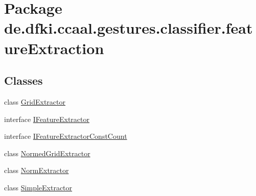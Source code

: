 \hypertarget{namespacede_1_1dfki_1_1ccaal_1_1gestures_1_1classifier_1_1feature_extraction}{\section{Package de.\-dfki.\-ccaal.\-gestures.\-classifier.\-feature\-Extraction}
\label{namespacede_1_1dfki_1_1ccaal_1_1gestures_1_1classifier_1_1feature_extraction}
}
\subsection*{Classes}
\begin{DoxyCompactItemize}
\item 
class \hyperlink{classde_1_1dfki_1_1ccaal_1_1gestures_1_1classifier_1_1feature_extraction_1_1_grid_extractor}{Grid\-Extractor}
\item 
interface \hyperlink{interfacede_1_1dfki_1_1ccaal_1_1gestures_1_1classifier_1_1feature_extraction_1_1_i_feature_extractor}{I\-Feature\-Extractor}
\item 
interface \hyperlink{interfacede_1_1dfki_1_1ccaal_1_1gestures_1_1classifier_1_1feature_extraction_1_1_i_feature_extractor_const_count}{I\-Feature\-Extractor\-Const\-Count}
\item 
class \hyperlink{classde_1_1dfki_1_1ccaal_1_1gestures_1_1classifier_1_1feature_extraction_1_1_normed_grid_extractor}{Normed\-Grid\-Extractor}
\item 
class \hyperlink{classde_1_1dfki_1_1ccaal_1_1gestures_1_1classifier_1_1feature_extraction_1_1_norm_extractor}{Norm\-Extractor}
\item 
class \hyperlink{classde_1_1dfki_1_1ccaal_1_1gestures_1_1classifier_1_1feature_extraction_1_1_simple_extractor}{Simple\-Extractor}
\end{DoxyCompactItemize}
